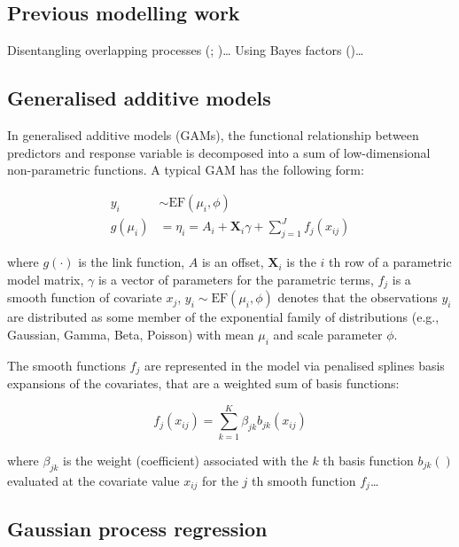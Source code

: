 \documentclass[
  doc,
  floatsintext,
  longtable,
  a4paper,
  nolmodern,
  notxfonts,
  notimes,
  colorlinks=true,linkcolor=blue,citecolor=blue,urlcolor=blue]{apa7}
\begin{document}
\subsection{Previous modelling work}\label{previous-modelling-work}

Disentangling overlapping processes
(;
)\ldots{}
Using Bayes factors ()\ldots{}

\subsection{Generalised additive
models}\label{generalised-additive-models}

In generalised additive models (GAMs), the functional relationship
between predictors and response variable is decomposed into a sum of
low-dimensional non-parametric functions. A typical GAM has the
following form:

\[
\begin{aligned} 
y_{i} &\sim \mathrm{EF}\left(\mu_{i}, \phi\right)\\
g\left(\mu_i\right) &= \eta_{i} = A_{i} + \mathbf{X}_{i} \gamma + \sum_{j=1}^{J} f_{j}\left(x_{ij}\right)
\end{aligned}
\]

where \(g(\cdot)\) is the link function, \(A\) is an offset,
\(\mathbf{X}_{i}\) is the \(i\) th row of a parametric model matrix,
\(\gamma\) is a vector of parameters for the parametric terms, \(f_{j}\)
is a smooth function of covariate \(x_{j}\),
\(y_{i} \sim \mathrm{EF}\left(\mu_{i}, \phi\right)\) denotes that the
observations \(y_{i}\) are distributed as some member of the exponential
family of distributions (e.g., Gaussian, Gamma, Beta, Poisson) with mean
\(\mu_{i}\) and scale parameter \(\phi\).

The smooth functions \(f_{j}\) are represented in the model via
penalised splines basis expansions of the covariates, that are a
weighted sum of basis functions:

\[
f_{j}\left(x_{i j}\right) = \sum_{k=1}^K \beta_{jk} b_{jk}\left(x_{ij}\right)
\]

where \(\beta_{jk}\) is the weight (coefficient) associated with the
\(k\) th basis function \(b_{j k}()\) evaluated at the covariate value
\(x_{ij}\) for the \(j\) th smooth function \(f_{j}\)\ldots{}

\subsection{Gaussian process
regression}\label{gaussian-process-regression}
\end{document}
